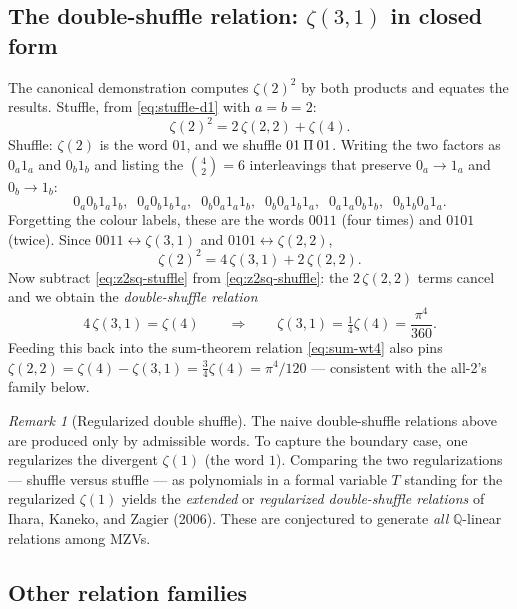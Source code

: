 \documentclass[11pt]{article}
\newcommand{\shuffle}{\mathbin{\rotatebox[origin=c]{180}{\ensuremath{\amalg}}}}
\theoremstyle{plain}
\theoremstyle{remark}
\newtheorem{remark}[theorem]{Remark}
\begin{document}
\subsection*{The double-shuffle relation: $\zeta(3,1)$ in closed form}

The canonical demonstration computes $\zeta(2)^2$ by both products and equates the results. Stuffle, from \eqref{eq:stuffle-d1} with $a=b=2$:
\begin{equation}
  \zeta(2)^2=2\,\zeta(2,2)+\zeta(4).
  \label{eq:z2sq-stuffle}
\end{equation}
Shuffle: $\zeta(2)$ is the word $01$, and we shuffle $01\shuffle01$. Writing the two factors as $0_a1_a$ and $0_b1_b$ and listing the $\binom{4}{2}=6$ interleavings that preserve $0_a\!\to\!1_a$ and $0_b\!\to\!1_b$:
\[
  0_a0_b1_a1_b,\;\;0_a0_b1_b1_a,\;\;0_b0_a1_a1_b,\;\;0_b0_a1_b1_a,\;\;0_a1_a0_b1_b,\;\;0_b1_b0_a1_a.
\]
Forgetting the colour labels, these are the words $0011$ (four times) and $0101$ (twice). Since $0011\leftrightarrow\zeta(3,1)$ and $0101\leftrightarrow\zeta(2,2)$,
\begin{equation}
  \zeta(2)^2=4\,\zeta(3,1)+2\,\zeta(2,2).
  \label{eq:z2sq-shuffle}
\end{equation}
Now subtract \eqref{eq:z2sq-stuffle} from \eqref{eq:z2sq-shuffle}: the $2\,\zeta(2,2)$ terms cancel and we obtain the \emph{double-shuffle relation}
\begin{equation}
  4\,\zeta(3,1)=\zeta(4)
  \qquad\Longrightarrow\qquad
  \zeta(3,1)=\tfrac14\zeta(4)=\frac{\pi^4}{360}.
  \label{eq:z31}
\end{equation}
Feeding this back into the sum-theorem relation \eqref{eq:sum-wt4} also pins $\zeta(2,2)=\zeta(4)-\zeta(3,1)=\tfrac34\zeta(4)=\pi^4/120$ --- consistent with the all-2's family below.

\begin{remark}[Regularized double shuffle]
The naive double-shuffle relations above are produced only by admissible words. To capture the boundary case, one regularizes the divergent $\zeta(1)$ (the word $1$). Comparing the two regularizations --- shuffle versus stuffle --- as polynomials in a formal variable $T$ standing for the regularized $\zeta(1)$ yields the \emph{extended} or \emph{regularized double-shuffle relations} of Ihara, Kaneko, and Zagier (2006). These are conjectured to generate \emph{all} $\mathbb{Q}$-linear relations among MZVs.
\end{remark}

\subsection*{Other relation families}
\end{document}
